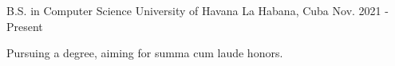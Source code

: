 \begin{cventries}
  \cventry
    {B.S. in Computer Science}
    {University of Havana}
    {La Habana, Cuba}
    {Nov. 2021 - Present}
    {
      \begin{cvitems}
        \item {Pursuing a degree, aiming for summa cum laude honors.}
      \end{cvitems}
    }
\end{cventries}
